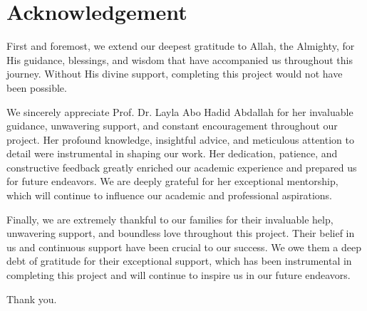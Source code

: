 \chapter*{Acknowledgement}

First and foremost, we extend our deepest gratitude to Allah, the Almighty, for His guidance, blessings, and wisdom that have accompanied us throughout this journey. Without His divine support, completing this project would not have been possible.

\vspace{1em}

We sincerely appreciate Prof. Dr. Layla Abo Hadid Abdallah for her invaluable guidance, unwavering support, and constant encouragement throughout our project. Her profound knowledge, insightful advice, and meticulous attention to detail were instrumental in shaping our work. Her dedication, patience, and constructive feedback greatly enriched our academic experience and prepared us for future endeavors. We are deeply grateful for her exceptional mentorship, which will continue to influence our academic and professional aspirations.
\vspace{1em}

Finally, we are extremely thankful to our families for their invaluable help, unwavering support, and boundless love throughout this project. Their belief in us and continuous support have been crucial to our success. We owe them a deep debt of gratitude for their exceptional support, which has been instrumental in completing this project and will continue to inspire us in our future endeavors.

\vspace{2em}

\begin{center}
    Thank you.
\end{center}